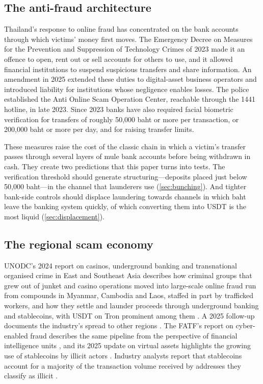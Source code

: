 \subsection{The anti-fraud architecture}

Thailand's response to online fraud has concentrated on the bank accounts through which victims' money first moves.
The Emergency Decree on Measures for the Prevention and Suppression of Technology Crimes of 2023 made it an offence to
open, rent out or sell accounts for others to use, and it allowed financial institutions to suspend suspicious
transfers and share information. An amendment in 2025 extended these duties to digital-asset business operators and
introduced liability for institutions whose negligence enables losses. The police established the Anti Online Scam
Operation Center, reachable through the 1441 hotline, in late 2023. Since 2023 banks have also required facial
biometric verification for transfers of roughly 50,000 baht or more per transaction, or 200,000 baht or more per day,
and for raising transfer limits.

These measures raise the cost of the classic chain in which a victim's transfer passes through several layers of mule
bank accounts before being withdrawn in cash. They create two predictions that this paper turns into tests. The
verification threshold should generate structuring---deposits placed just below 50,000 baht---in the channel that
launderers use (\cref{sec:bunching}). And tighter bank-side controls should displace laundering towards channels in
which baht leave the banking system quickly, of which converting them into USDT is the most liquid (\cref{sec:displacement}).

\subsection{The regional scam economy}

UNODC's 2024 report on casinos, underground banking and transnational organised crime in East and Southeast Asia
describes how criminal groups that grew out of junket and casino operations moved into large-scale online fraud run
from compounds in Myanmar, Cambodia and Laos, staffed in part by trafficked workers, and how they settle and launder
proceeds through underground banking and stablecoins, with USDT on Tron prominent among them \citep{unodc2024casinos}.
A 2025 follow-up documents the industry's spread to other regions \citep{unodc2025inflection}. The FATF's report on
cyber-enabled fraud describes the same pipeline from the perspective of financial intelligence units
\citep{fatf2023cyberfraud}, and its 2025 update on virtual assets highlights the growing use of stablecoins by illicit
actors \citep{fatf2025targeted}. Industry analysts report that stablecoins account for a majority of the transaction
volume received by addresses they classify as illicit \citep{chainalysis2025crime}.

